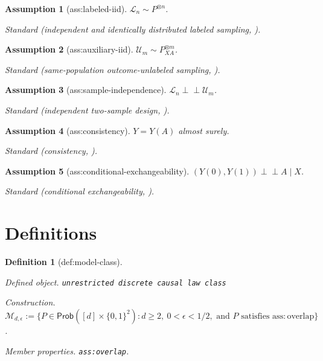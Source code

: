 \documentclass{article}
\newtheorem{assumption}{Assumption}
\newtheorem{definition}{Definition}
\begin{document}
\begin{assumption}[ass:labeled-iid]\label{ass:labeled-iid}
\(\mathcal L_n\sim P^{\otimes n}\).
\par\smallskip\noindent\emph{Standard} (independent and identically distributed labeled sampling, \cite{ZengBalakrishnanHanKennedy2024}).
\end{assumption}

\begin{assumption}[ass:auxiliary-iid]\label{ass:auxiliary-iid}
\(\mathcal U_m\sim P_{XA}^{\otimes m}\).
\par\smallskip\noindent\emph{Standard} (same-population outcome-unlabeled sampling, \cite{ChakraborttyDai2024}).
\end{assumption}

\begin{assumption}[ass:sample-independence]\label{ass:sample-independence}
\(\mathcal L_n\perp\!\!\!\perp\mathcal U_m\).
\par\smallskip\noindent\emph{Standard} (independent two-sample design, \cite{ChakraborttyDai2024}).
\end{assumption}

\begin{assumption}[ass:consistency]\label{ass:consistency}
\(Y=Y(A)\) almost surely.
\par\smallskip\noindent\emph{Standard} (consistency, \cite{ZengBalakrishnanHanKennedy2024}).
\end{assumption}

\begin{assumption}[ass:conditional-exchangeability]\label{ass:conditional-exchangeability}
\((Y(0),Y(1))\perp\!\!\!\perp A\mid X\).
\par\smallskip\noindent\emph{Standard} (conditional exchangeability, \cite{ZengBalakrishnanHanKennedy2024}).
\end{assumption}

\section{Definitions}

\begin{definition}[def:model-class]\label{def:model-class}
\par\smallskip\noindent\emph{Defined object.} \texttt{unrestricted discrete causal law class}
\par\smallskip\noindent\emph{Construction.} \(\mathcal M_{d,\epsilon}:=\{P\in\mathsf{Prob}([d]\times\{0,1\}^2): d\ge2,\ 0<\epsilon<1/2,\text{ and }P\text{ satisfies }\mathrm{ass:overlap}\}\).
\par\smallskip\noindent\emph{Member properties.} \texttt{ass:\allowbreak{}overlap}.
\end{definition}
\end{document}
